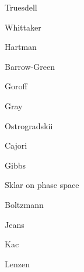 \documentclass{article}
\begin{document}
Truesdell \cite[pp.~101, 105, 351]{continuum}

Whittaker \cite[p.~323, \S 148]{whittaker}

Hartman \cite[p.~91]{hartman}

Barrow-Green \cite[p.~83]{threebody}

Goroff \cite[p.~I79]{goroff1}

Gray \cite[p.~380]{gray}

Ostrogradskii \cite[pp.~122--123]{kolmogorov3}

Cajori \cite[vol. II, p.~101, \S 464]{cajori}

Gibbs \cite[Chapter XII]{gibbs1902}

Sklar \cite[p.~130]{sklar2013} on phase space

Boltzmann \cite[pp.~274--290, 443]{boltzmann}

Jeans \cite[p.~258, \S 206]{jeans}

Kac \cite[p.~63]{kac}

Lenzen \cite[p.~129]{lenzen}

\nocite{*}



\end{document}
